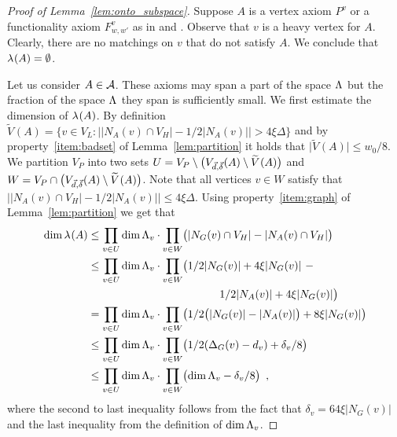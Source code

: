 \documentclass{theoretics}
\providecommand{\abs}[1]{\lvert#1\rvert}
\providecommand{\Abs}[1]{\bigl\lvert#1\bigr\rvert}
\newcommand{\set}[1]{\{ #1 \}}
\newcommand{\setdescr}[3][\mid]{\set{ #2 #1 #3 }}
\newcommand{\setsize}[1]{\lvert#1\rvert}
\newcommand{\eqcomma}{\enspace ,}
\newcommand{\reflem}[1]{Lemma~\ref{#1}}
\newcommand{\heavy}{heavy\xspace}
\newcommand{\neigh}[2][]{N_{{#1}}(#2)}
\renewcommand{\deg}[2][XXXXXXXXXXXX]{\Delta_{#1}(#2)}
\newcommand{\diff}{\xi}
\newcommand{\ontocdiff}{64}
\newcommand{\GdegMax}{\Delta}
\newcommand{\V}[1][]{V_{#1}}
\newcommand{\Vl}{\V[L]}
\newcommand{\Vp}{\V[P]}
\newcommand{\Vh}{\V[H]}
\newcommand{\Vbad}[2][]{\widetilde V^{#1}(#2)}
\newcommand{\Ax}{\ensuremath\mathcal{A}}
\newcommand{\thr}[1]{ \ensuremath d_{{#1}} }
\newcommand{\vecthr}{\vec{d}}
\newcommand{\adv}[1]{\delta_{{#1}}}
\newcommand{\vecadv}{\vec{\delta}}
\newcommand{\linspace}[1][]{\ensuremath \Lambda_{{#1}}}
\newcommand{\linmap}[1][]{\ensuremath \lambda_{{#1}}}
\newcommand{\linmapof}[2][]{\linmap[#1](#2)}
\newcommand{\Vthick}[1]{\ensuremath V_{\vecthr,\vecadv}(#1)}
\numberwithin{equation}{section}
\begin{document}
  \begin{proof}[Proof of \reflem{lem:onto_subspace}]
    Suppose $A$ is a vertex axiom $P^v$ 
    or a functionality axiom $F^{v}_{w,w'}$ as in 
    and .
    Observe that $v$ is a \heavy vertex for $A$.
    Clearly, there are no matchings on $v$ that do not
    satisfy $A$. We conclude that $\linmapof{A} = \emptyset$.
  
    Let us consider $A \in \Ax$. 
    These axioms may span a part of the space $\linspace$ but 
    the fraction of the space $\linspace$ they span 
    is sufficiently small. 
    We first estimate the dimension of $\linmapof{A}$.
    By definition $\Vbad{A} = \setdescr[:]{v \in \Vl}{
			\Abs{ \abs{ \neigh[A]{v} \cap \Vh } - 
			1/2\abs{ \neigh[A]{v} } } > 
			4 \diff \GdegMax} $
    and by property~\ref{item:badset} of \reflem{lem:partition}
    it holds that
    $\setsize{\Vbad{A}} \leq w_0/8$. We partition $\Vp$ into two sets 
    $U = \Vp \setminus \bigl( \Vthick{A} \setminus \Vbad{A} \bigr)$ and
    $W = \Vp \cap \bigl( \Vthick{A} \setminus \Vbad{A} \bigr)$.
    Note that all vertices $v \in W$ satisfy that
    $\Abs{ \abs{ \neigh[A]{v} \cap \Vh } - 
			1/2\abs{ \neigh[A]{v} } } \le
			4 \diff \GdegMax$.
    Using property~\ref{item:graph} of \reflem{lem:partition}
    we get that
    \begin{align}
      \dim \linmapof{A} 
      &\le \prod_{v \in U}
      \dim \linspace[v] 
      \cdot \prod_{v \in W} 
      \bigl(\abs{ \neigh[G]{v} \cap \Vh } 
      - \abs{ \neigh[A]{v} \cap \Vh } \bigr)
      \\
      &\le \prod_{v \in U} \dim \linspace[v] 
      \cdot \prod_{v \in W}
      \bigl(
      1/2\abs{ \neigh[G]{v} } + 4 \diff \abs{ \neigh[G]{v} } ~
      -  \nonumber\\
      &\qquad\qquad\qquad\qquad\qquad\qquad
      1/2\abs{ \neigh[A]{v} } + 4 \diff \abs{ \neigh[G]{v} }
      \bigr)
      \\
      &= \prod_{v \in U} \dim \linspace[v] 
      \cdot \prod_{v \in W} 
      \bigl(
      1/2\bigl(\abs{ \neigh[G]{v} } - \abs{ \neigh[A]{v} } \bigr) 
      + 
      8 \diff \abs{ \neigh[G]{v} } 
      \bigr)
      \\
      &\le \prod_{v \in U} \dim \linspace[v] 
      \cdot \prod_{v \in W}  
      \bigl(
      1/2(\deg[G]{v} - \thr{v}) 
      + 
      \adv{v}/8
      \bigr)
      \\
      &\le \prod_{v \in U} \dim \linspace[v] 
      \cdot \prod_{v \in W} 
      \bigl( \dim \linspace[v] - \adv{v}/8 \bigr) \eqcomma
    \end{align}
    where the second to last inequality follows from 
    the fact that $\adv{v} = \ontocdiff \diff \abs{ \neigh[G]{v} } $ 
    and the last inequality from the definition of $\dim \linspace[v]$.
    

\end{proof}
\end{document}
